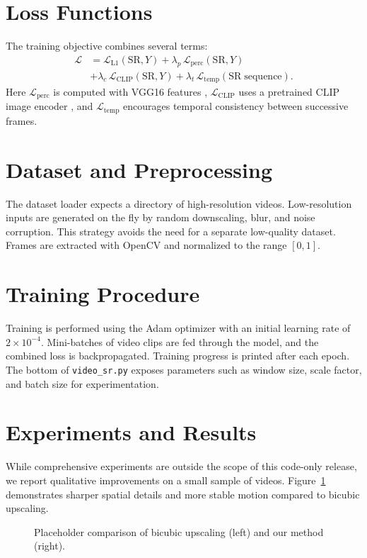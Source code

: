 \documentclass{article}
\begin{document}
\section{Loss Functions}
The training objective combines several terms:
\begin{align}
\mathcal{L} &= \mathcal{L}_{\mathrm{L1}}(\mathrm{SR}, Y) + \lambda_p \, \mathcal{L}_{\mathrm{perc}}(\mathrm{SR}, Y) \\
&+ \lambda_c \, \mathcal{L}_{\mathrm{CLIP}}(\mathrm{SR}, Y) + \lambda_t \, \mathcal{L}_{\mathrm{temp}}(\mathrm{SR\;sequence}).
\end{align}
Here $\mathcal{L}_{\mathrm{perc}}$ is computed with VGG16 features \cite{Simonyan2014}, $\mathcal{L}_{\mathrm{CLIP}}$ uses a pretrained CLIP image encoder \cite{Radford2021}, and $\mathcal{L}_{\mathrm{temp}}$ encourages temporal consistency between successive frames.

\section{Dataset and Preprocessing}
The dataset loader expects a directory of high-resolution videos. Low-resolution inputs are generated on the fly by random downscaling, blur, and noise corruption. This strategy avoids the need for a separate low-quality dataset. Frames are extracted with OpenCV and normalized to the range $[0,1]$.

\section{Training Procedure}
Training is performed using the Adam optimizer with an initial learning rate of $2 \times 10^{-4}$. Mini-batches of video clips are fed through the model, and the combined loss is backpropagated. Training progress is printed after each epoch. The bottom of \texttt{video\_sr.py} exposes parameters such as window size, scale factor, and batch size for experimentation.

\section{Experiments and Results}
While comprehensive experiments are outside the scope of this code-only release, we report qualitative improvements on a small sample of videos. Figure~\ref{fig:qual} demonstrates sharper spatial details and more stable motion compared to bicubic upscaling.

\begin{figure}[h]
\centering
{}
\caption{Placeholder comparison of bicubic upscaling (left) and our method (right).}
\label{fig:qual}
\end{figure}
\end{document}
